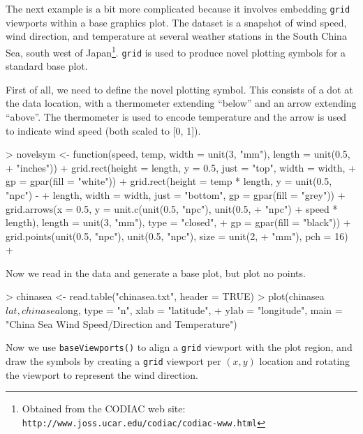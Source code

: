 \documentclass[a4paper]{article}
\newcommand{\grid}{{\tt grid}}
\begin{document}
The next example is a bit more complicated because it involves 
embedding \grid{} viewports within a base graphics plot.
The dataset is a snapshot of wind speed, wind direction, and temperature
at several weather stations in the South China Sea, south west of 
Japan\footnote{Obtained from the CODIAC web site:
{\tt http://www.joss.ucar.edu/codiac/codiac-www.html}}.
\grid{} is used to produce novel plotting symbols for a standard
base plot.

First of all, we need to define the novel plotting symbol.  This consists
of a dot at the data location, with a thermometer extending ``below''
and an arrow extending ``above''.  The thermometer is used to encode 
temperature 
and the arrow is used to indicate wind speed 
(both scaled to [0, 1]).

\begin{Schunk}
\begin{Sinput}
> novelsym <- function(speed, temp, width = unit(3, "mm"), length = unit(0.5, 
+     "inches")) {
+     grid.rect(height = length, y = 0.5, just = "top", width = width, 
+         gp = gpar(fill = "white"))
+     grid.rect(height = temp * length, y = unit(0.5, "npc") - 
+         length, width = width, just = "bottom", gp = gpar(fill = "grey"))
+     grid.arrows(x = 0.5, y = unit.c(unit(0.5, "npc"), unit(0.5, 
+         "npc") + speed * length), length = unit(3, "mm"), type = "closed", 
+         gp = gpar(fill = "black"))
+     grid.points(unit(0.5, "npc"), unit(0.5, "npc"), size = unit(2, 
+         "mm"), pch = 16)
+ }
\end{Sinput}
\end{Schunk}
Now we read in the data and generate a base plot, but plot no points.

\begin{Schunk}
\begin{Sinput}
> chinasea <- read.table("chinasea.txt", header = TRUE)
> plot(chinasea$lat, chinasea$long, type = "n", xlab = "latitude", 
+     ylab = "longitude", main = "China Sea Wind Speed/Direction and Temperature")
\end{Sinput}
\end{Schunk}
Now we use \verb|baseViewports()| to align a \grid{} viewport
with the plot region, and draw the symbols by creating a 
\grid{} viewport per $(x, y)$ location and rotating the viewport to
represent the wind direction.
\end{document}
